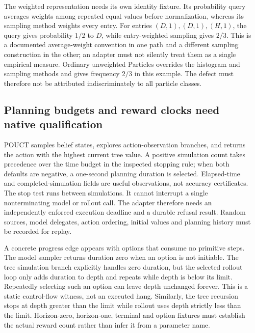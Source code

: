 The weighted representation needs its own identity fixture. Its probability
query averages weights among repeated equal values before normalization,
whereas its sampling method weights every entry. For entries $(D,1),(D,1),(H,1)$,
the query gives probability $1/2$ to $D$, while entry-weighted sampling gives
$2/3$. This is a documented average-weight convention in one path and a
different sampling construction in the other; an adapter must not silently
treat them as a single empirical measure. Ordinary unweighted Particles
overrides the histogram and sampling methods and gives frequency $2/3$ in
this example. The defect must therefore not be attributed indiscriminately to
all particle classes. \cite{exec23_pomdppy_sources,exec23_pomdppy_reference}

\subsection{Planning budgets and reward clocks need native qualification}
\label{exec23:pomdppy-planning}
POUCT samples belief states, explores action-observation branches, and returns
the action with the highest current tree value. A positive simulation count
takes precedence over the time budget in the inspected stopping rule; when
both defaults are negative, a one-second planning duration is selected.
Elapsed-time and completed-simulation fields are useful observations, not
accuracy certificates. The stop test runs between simulations. It cannot
interrupt a single nonterminating model or rollout call. The adapter therefore
needs an independently enforced execution deadline and a durable refusal result.
Random sources, model delegates, action ordering, initial values and planning
history must be recorded for replay. \cite{exec23_pomdppy_sources}

A concrete progress edge appears with options that consume no primitive steps.
The model sampler returns duration zero when an option is not initiable.
The tree simulation branch explicitly handles zero duration, but the selected
rollout loop only adds duration to depth and repeats while depth is below its
limit. Repeatedly selecting such an option can leave depth unchanged forever.
This is a static control-flow witness, not an executed hang. Similarly, the
tree recursion stops at depth greater than the limit while rollout uses depth
strictly less than the limit. Horizon-zero, horizon-one, terminal and option
fixtures must establish the actual reward count rather than infer it from a
parameter name. \cite{exec23_pomdppy_sources,exec23_pomdppy_reference}

